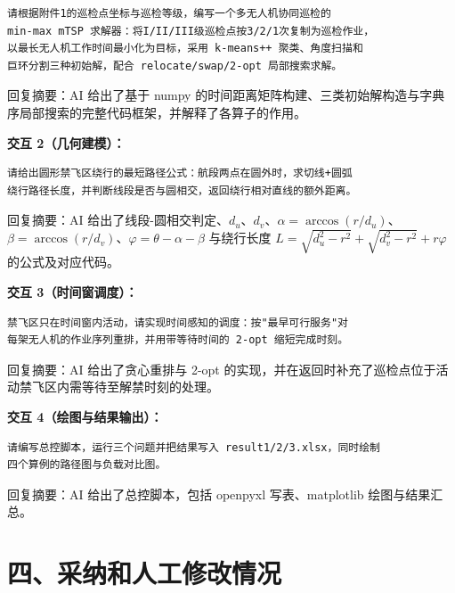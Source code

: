 \documentclass[12pt,a4paper]{ctexart}
\begin{document}
\begin{lstlisting}[language={},caption={提示词 1}]
请根据附件1的巡检点坐标与巡检等级，编写一个多无人机协同巡检的
min-max mTSP 求解器：将I/II/III级巡检点按3/2/1次复制为巡检作业，
以最长无人机工作时间最小化为目标，采用 k-means++ 聚类、角度扫描和
巨环分割三种初始解，配合 relocate/swap/2-opt 局部搜索求解。
\end{lstlisting}

回复摘要：AI 给出了基于 numpy 的时间距离矩阵构建、三类初始解构造与字典序局部搜索的完整代码框架，并解释了各算子的作用。

\textbf{交互 2（几何建模）：}

\begin{lstlisting}[language={},caption={提示词 2}]
请给出圆形禁飞区绕行的最短路径公式：航段两点在圆外时，求切线+圆弧
绕行路径长度，并判断线段是否与圆相交，返回绕行相对直线的额外距离。
\end{lstlisting}

回复摘要：AI 给出了线段-圆相交判定、$d_u$、$d_v$、$\alpha=\arccos(r/d_u)$、$\beta=\arccos(r/d_v)$、$\varphi=\theta-\alpha-\beta$ 与绕行长度 $L=\sqrt{d_u^2-r^2}+\sqrt{d_v^2-r^2}+r\varphi$ 的公式及对应代码。

\textbf{交互 3（时间窗调度）：}

\begin{lstlisting}[language={},caption={提示词 3}]
禁飞区只在时间窗内活动，请实现时间感知的调度：按"最早可行服务"对
每架无人机的作业序列重排，并用带等待时间的 2-opt 缩短完成时刻。
\end{lstlisting}

回复摘要：AI 给出了贪心重排与 2-opt 的实现，并在返回时补充了巡检点位于活动禁飞区内需等待至解禁时刻的处理。

\textbf{交互 4（绘图与结果输出）：}

\begin{lstlisting}[language={},caption={提示词 4}]
请编写总控脚本，运行三个问题并把结果写入 result1/2/3.xlsx，同时绘制
四个算例的路径图与负载对比图。
\end{lstlisting}

回复摘要：AI 给出了总控脚本，包括 openpyxl 写表、matplotlib 绘图与结果汇总。

\section*{四、采纳和人工修改情况}
\end{document}
